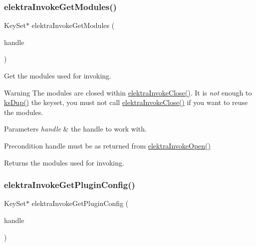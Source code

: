 \subsubsection{\texorpdfstring{elektraInvokeGetModules()}{elektraInvokeGetModules()}}
{\footnotesize\ttfamily Key\+Set$\ast$ elektra\+Invoke\+Get\+Modules (\begin{DoxyParamCaption}\item[{Elektra\+Invoke\+Handle $\ast$}]{handle }\end{DoxyParamCaption})}



Get the modules used for invoking. 

\begin{DoxyWarning}{Warning}
The modules are closed within \mbox{\hyperlink{group__invoke_ga684a21daa0b3c20783c55184a9157b3b}{elektra\+Invoke\+Close()}}. It is {\itshape not} enough to \mbox{\hyperlink{group__keyset_gac59e4b328245463f1451f68d5106151c}{ks\+Dup()}} the keyset, you must not call \mbox{\hyperlink{group__invoke_ga684a21daa0b3c20783c55184a9157b3b}{elektra\+Invoke\+Close()}} if you want to reuse the modules.
\end{DoxyWarning}

\begin{DoxyParams}{Parameters}
{\em handle} & the handle to work with.\\
\hline
\end{DoxyParams}
\begin{DoxyPrecond}{Precondition}
handle must be as returned from \mbox{\hyperlink{group__invoke_ga3eb20131e9a8fc9a6cebf126927c09bc}{elektra\+Invoke\+Open()}}
\end{DoxyPrecond}
\begin{DoxyReturn}{Returns}
the modules used for invoking. 
\end{DoxyReturn}
\mbox{\label{group__invoke_gafc090b80f3ba846bf3c3fd8ccd34f2f5}} 
\subsubsection{\texorpdfstring{elektraInvokeGetPluginConfig()}{elektraInvokeGetPluginConfig()}}
{\footnotesize\ttfamily Key\+Set$\ast$ elektra\+Invoke\+Get\+Plugin\+Config (\begin{DoxyParamCaption}\item[{Elektra\+Invoke\+Handle $\ast$}]{handle }\end{DoxyParamCaption})}



